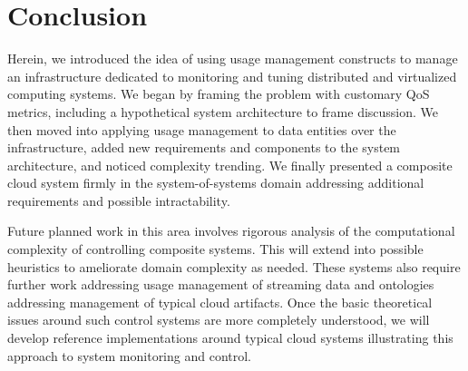 \documentclass[times, 10pt,twocolumn]{article}
\begin{document}
\section{Conclusion}
Herein, we introduced the idea of using usage management constructs to manage an infrastructure dedicated to monitoring and tuning distributed and virtualized computing systems.  We began by framing the problem with customary QoS metrics, including a hypothetical system architecture to frame discussion.  We then moved into applying usage management to data entities over the infrastructure, added new requirements and components to the system architecture, and noticed complexity trending.  We finally presented a composite cloud system firmly in the system-of-systems domain addressing additional requirements and possible intractability.

Future planned work in this area involves rigorous analysis of the computational complexity of controlling composite systems.  This will extend into possible heuristics to ameliorate domain complexity as needed.  These systems also require further work addressing usage management of streaming data and ontologies addressing management of typical cloud artifacts.  Once the basic theoretical issues around such control systems are more completely understood, we will develop reference implementations around typical cloud systems illustrating this approach to system monitoring and control.



\end{document}
